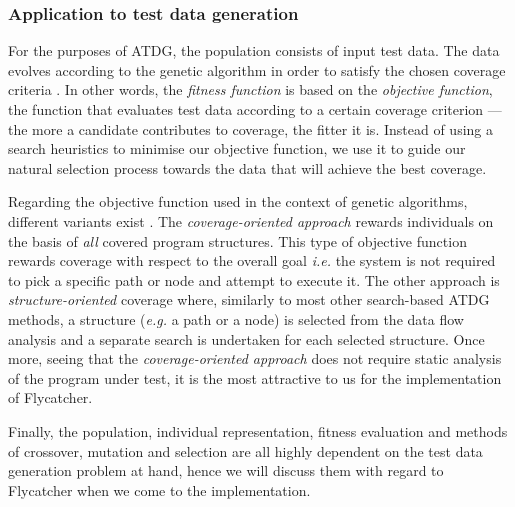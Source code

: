 \subsubsection{Application to test data generation}
\label{subsubsec:ga_application}
For the purposes of ATDG, the population consists of input test data. The data evolves according to the genetic algorithm in order to satisfy the chosen coverage criteria \cite{michael2001generating}. In other words, the \emph{fitness function} is based on the \emph{objective function}, the function that evaluates test data according to a certain coverage criterion --- the more a candidate contributes to coverage, the fitter it is. Instead of using a search heuristics to minimise our objective function, we use it to guide our natural selection process towards the data that will achieve the best coverage.

Regarding the objective function used in the context of genetic algorithms, different variants exist \cite{mcminn2004search}. The \emph{coverage-oriented approach} rewards individuals on the basis of \emph{all} covered program structures. This type of objective function rewards coverage with respect to the overall goal \emph{i.e.} the system is not required to pick a specific path or node and attempt to execute it. The other approach is \emph{structure-oriented} coverage where, similarly to most other search-based ATDG methods, a structure (\emph{e.g.} a path or a node) is selected from the data flow analysis and a separate search is undertaken for each selected structure. Once more, seeing that the \emph{coverage-oriented approach} does not require static analysis of the program under test, it is the most attractive to us for the implementation of \textsf{Flycatcher}.

Finally, the population, individual representation, fitness evaluation and methods of crossover, mutation and selection are all highly dependent on the test data generation problem at hand, hence we will discuss them with regard to \textsf{Flycatcher} when we come to the implementation.




